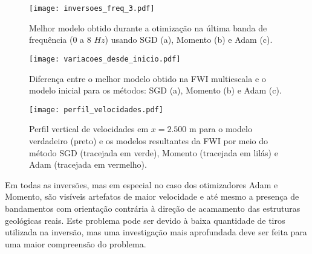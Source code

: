     \begin{figure}
      \begin{center}
        \texttt{[image: inversoes\_freq\_3.pdf]}
      \end{center}
      \caption{Melhor modelo obtido durante a otimização na última banda de frequência (0 a 8 $Hz$) usando SGD (a), Momento (b) e Adam (c).}
      \label{f:inversoes_freq_3}
    \end{figure}

    \begin{figure}
      \begin{center}
        \texttt{[image: variacoes\_desde\_inicio.pdf]}
      \end{center}
      \caption{Diferença entre o melhor modelo obtido na FWI multiescala e o modelo inicial para os métodos: SGD (a), Momento (b) e Adam (c).}
      \label{f:variacoes_desde_inicio}
    \end{figure}

    \begin{figure}
      \begin{center}
        \texttt{[image: perfil\_velocidades.pdf]}
      \end{center}
      \caption{Perfil vertical de velocidades em $x=2.500$ m para o modelo verdadeiro (preto) e os modelos resultantes da FWI por meio do método SGD (tracejada em verde), Momento (tracejada em lilás) e Adam (tracejada em vermelho).}
      \label{f:perfil_velocidades}
    \end{figure}

    Em todas as inversões, mas em especial no caso dos otimizadores Adam e Momento, são visíveis artefatos de maior velocidade e até mesmo a presença de bandamentos com orientação contrária à direção de acamamento das estruturas geológicas reais. Este problema pode ser devido à baixa quantidade de tiros utilizada na inversão, mas uma investigação mais aprofundada deve ser feita para uma maior compreensão do problema.
